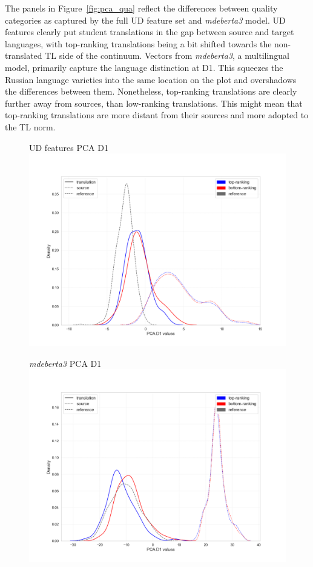The panels in Figure~\ref{fig:pca_qua} reflect the differences between quality categories as captured by the full UD feature set and \textit{mdeberta3} model. UD features clearly put student translations in the gap between source and target languages, with top-ranking translations being a bit shifted towards the non-translated TL side of the continuum. 
Vectors from \textit{mdeberta3}, a multilingual model, primarily capture the language distinction at D1. This squeezes the Russian language varieties into the same location on the plot and overshadows the differences between them. Nonetheless, top-ranking translations are clearly further away from sources, than low-ranking translations. This might mean that top-ranking translations are more distant from their sources and more adopted to the TL norm. 
\begin{figure}[H]
	\begin{minipage}[c]{0.5\linewidth}
		\centering
		UD features PCA D1
		\includegraphics[width=\linewidth]{figures/pca/src-qua-ttype-ud-PCA-D1-lines}
	\end{minipage}	
	\begin{minipage}[c]{0.5\linewidth}
		\centering
		\textit{mdeberta3} PCA D1
		\includegraphics[width=\linewidth]{figures/pca/src-qua-ttype-mdeberta3-base-PCA-D1-lines}

\end{minipage}
\end{figure}
